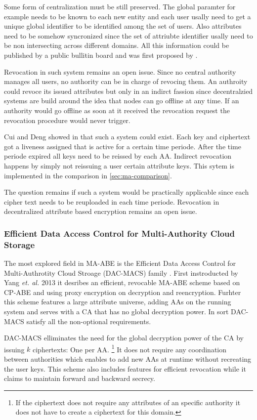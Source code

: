 Some form of centralization must be still preserved. The global paramter for example needs to be known to each new entity and each user usally need to get a unique global identifier to be identified among the set of users. Also attributes need to be somehow syncronized since the set of attriubte identifier usally need to be non intersecting across different domains. All this information could be published by a public bullitin board and was first proposed by \cite{lewko2011decentralizing}. 

Revocation in such system remains an open issue. Since no central authority manages all users, no authority can be in charge of revocing them. An authroity could revoce its issued attributes but only in an indirct fassion since decentralzied systems are build around the idea that nodes can go offline at any time. If an authority would go offline as soon at it received the revocation request the revocation procedure would never trigger. 

Cui and Deng showed in \cite{cui2016revocable} that such a system could exist. Each key and ciphertext got a liveness assigned that is active for a certain time periode. After the time periode expired all keys need to be reissed by each \ac{AA}. Indirect revocation happens by simply not reissuing a user certain attribute keys. This sytem is implemented in the comparison in \ref{sec:ma-comparison}.

The question remains if such a system would be practically applicable since each cipher text needs to be reuploaded in each time periode. Revocation in decentralized attribute based encryption remains an open issue.

\subsubsection{Efficient Data Access Control for Multi-Authority Cloud Storage}
The most explored field in \ac{MA-ABE} is the Efficient Data Access Control for Multi-Authrotity Cloud Stroage (\ac{DAC-MACS}) family \cite{yang2013dac}. First instroducted by Yang \textit{et. al.} 2013 it desribes an efficient, revocable \ac{MA-ABE} scheme based on \ac{CP-ABE} and using proxy encryption on decryption and reencryption. Furhter this scheme features a large attribute universe, adding \ac{AA}s on the running system and serves with a \ac{CA} that has no global decryption power. In sort \ac{DAC-MACS} satisfy all the non-optional requirements.

\ac{DAC-MACS} elliminates the need for the global decryption power of the \ac{CA} by issuing $k$ ciphertexts: One per \ac{AA}. \footnote{If the ciphertext does not require any attributes of an specific authority it does not have to create a ciphertext for this domain.} It does not require any coordination between authorities which enables to add new \ac{AA}s at runtime without recreating the user keys. This scheme also includes features for efficient revocation while it claims to maintain forward and backward secrecy.


